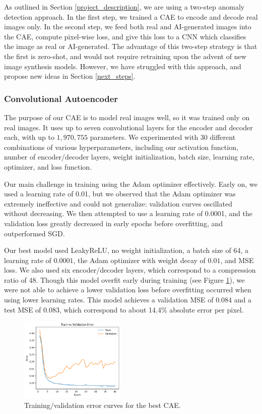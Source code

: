 \documentclass{article} %
\begin{document}
As outlined in Section \ref{project_description}, we are using a two-step anomaly detection approach. In the first step, we trained a CAE to encode and decode real images only. In the second step, we feed both real and AI-generated images into the CAE, compute pixel-wise loss, and give this loss to a CNN which classifies the image as real or AI-generated. The advantage of this two-step strategy is that the first is zero-shot, and would not require retraining upon the advent of new image synthesis models. However, we have struggled with this approach, and propose new ideas in Section \ref{next_steps}.

\subsubsection{Convolutional Autoencoder}

The purpose of our CAE is to model real images well, so it was trained only on real images. It uses up to seven convolutional layers for the encoder and decoder each, with up to $1,970,755$ parameters. We experimented with 30 different combinations of various hyperparameters, including our activation function, number of encoder/decoder layers, weight initialization, batch size, learning rate, optimizer, and loss function.

Our main challenge in training using the Adam optimizer effectively. Early on, we used a learning rate of 0.01, but we observed that the Adam optimizer was extremely ineffective and could not generalize: validation curves oscillated without decreasing. We then attempted to use a learning rate of 0.0001, and the validation loss greatly decreased in early epochs before overfitting, and outperformed SGD.

Our best model used LeakyReLU, no weight initialization, a batch size of 64, a learning rate of $0.0001$, the Adam optimizer with weight decay of $0.01$, and MSE loss. We also used six encoder/decoder layers, which correspond to a compression ratio of 48. Though this model overfit early during training (see Figure \ref{fig:cae_curves}), we were not able to achieve a lower validation loss before overfitting occurred when using lower learning rates. This model achieves a validation MSE of 0.084 and a test MSE of 0.083, which correspond to about 14.4\% absolute error per pixel.

\begin{figure}[h]
    \begin{center}
        \includegraphics[width=0.45\textwidth]{figs/cae_error_curves.png}
    \end{center}
    \caption{Training/validation error curves for the best CAE.}
    \label{fig:cae_curves}
\end{figure}
\end{document}
